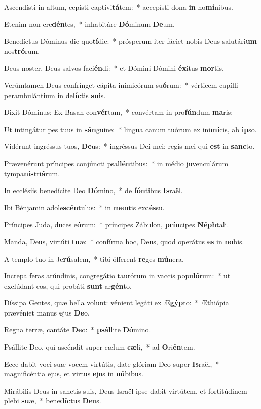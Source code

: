 \item Ascendísti in altum, cepísti captivi\textbf{tá}tem:~* accepísti dona \textbf{in} ho\textbf{mí}nibus.
\item Etenim non cre\textbf{dén}tes,~* inhabitáre \textbf{Dó}minum \textbf{De}um.
\item Benedíctus Dóminus die quo\textbf{tí}die:~* prósperum iter fáciet nobis Deus salutári\textbf{um} nos\textbf{tró}rum.
\item Deus noster, Deus salvos faci\textbf{én}di:~* et Dómini Dómini \textbf{éx}itus \textbf{mor}tis.
\item Verúmtamen Deus confrínget cápita inimicórum su\textbf{ó}rum:~* vérticem capílli perambulántium in de\textbf{líc}tis \textbf{su}is.
\item Dixit Dóminus: Ex Basan con\textbf{vér}tam,~* convértam in pro\textbf{fún}dum \textbf{ma}ris:
\item Ut intingátur pes tuus in \textbf{sán}guine:~* lingua canum tuórum ex ini\textbf{mí}cis, ab \textbf{ip}so.
\item Vidérunt ingréssus tuos, \textbf{De}us:~* ingréssus Dei mei: regis mei qui \textbf{est} in \textbf{sanc}to.
\item Prævenérunt príncipes conjúncti psal\textbf{lén}tibus:~* in médio juvenculárum tympa\textbf{nis}tri\textbf{á}rum.
\item In ecclésiis benedícite Deo \textbf{Dó}mino,~* de \textbf{fón}tibus \textbf{Is}raël.
\item Ibi Bénjamin adole\textbf{scén}tulus:~* in \textbf{men}tis ex\textbf{cés}su.
\item Príncipes Juda, duces e\textbf{ó}rum:~* príncipes Zábulon, \textbf{prín}cipes \textbf{Néph}tali.
\item Manda, Deus, virtúti \textbf{tu}æ:~* confírma hoc, Deus, quod operátus \textbf{es} in \textbf{no}bis.
\item A templo tuo in Je\textbf{rú}salem,~* tibi ófferent \textbf{re}ges \textbf{mú}nera.
\item Increpa feras arúndinis, congregátio taurórum in vaccis popu\textbf{ló}rum:~* ut exclúdant eos, qui probáti \textbf{sunt} ar\textbf{gén}to.
\item Díssipa Gentes, quæ bella volunt: vénient legáti ex Æ\textbf{gýp}to:~* Æthiópia prævéniet manus \textbf{e}jus \textbf{De}o.
\item Regna terræ, cantáte \textbf{De}o:~* \textbf{psál}lite \textbf{Dó}mino.
\item Psállite Deo, qui ascéndit super cælum \textbf{cæ}li,~* ad \textbf{O}ri\textbf{én}tem.
\item Ecce dabit voci suæ vocem virtútis, date glóriam Deo super \textbf{Is}raël,~* magnificéntia ejus, et virtus \textbf{e}jus in \textbf{nú}bibus.
\item Mirábilis Deus in sanctis suis, Deus Israël ipse dabit virtútem, et fortitúdinem plebi \textbf{su}æ,~* bene\textbf{díc}tus \textbf{De}us.
